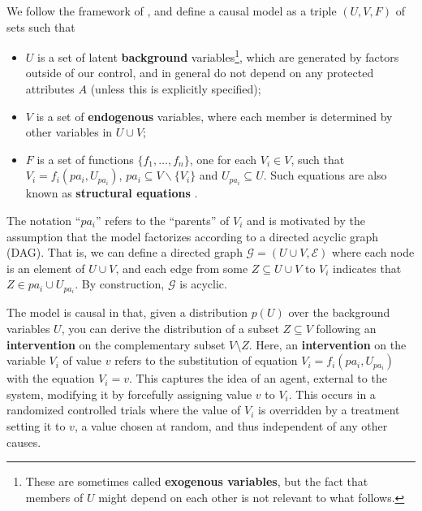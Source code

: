 


\label{subsec:cmc}
We follow the framework of \citet{pearl:00}, and define a causal
model as a triple $(U, V, F)$ of sets such that
%
\begin{itemize}
\item $U$ is a set of latent {\bf background} variables\footnote{These are
  sometimes called {\bf exogenous variables}, but the fact that members of $U$
  might depend on each other is not relevant to what follows.}, which are generated by factors
outside of our control, and in general do not depend on any protected attributes $A$ (unless this is explicitly specified);
\item $V$ is a set of {\bf endogenous} variables, where each member is determined by
  other variables in $U \cup V$;
\item $F$ is a set of functions $\{f_1, \dots, f_n\}$, one for each $V_i \in V$, such
that $V_i = f_i(pa_i, U_{pa_i})$, $pa_i \subseteq V \backslash
\{V_i\}$ and $U_{pa_i} \subseteq U$. Such equations are also known as
{\bf structural equations} \citep{bol:89}.
\end{itemize}
%
The notation ``$pa_i$'' refers to the ``parents'' of $V_i$ and is motivated by the assumption that the
model factorizes according to a directed acyclic graph (DAG). That is, we can
define a directed graph ${\mathcal G}=(U \cup V, \mathcal E )$ where each node is an
element of $U \cup V$, and each edge from some $Z \subseteq U \cup V$ to $V_i$ indicates that $Z \in pa_i \cup U_{pa_i}$. By construction, $\mathcal G$ is
acyclic.

The model is causal in that, given a distribution $p(U)$
over the background variables $U$, you can derive the distribution of
a subset $Z \subseteq V$ following an {\bf intervention} on the
complementary subset $V\setminus Z$.  Here,
an {\bf intervention} on the variable $V_i$ of value $v$ refers to the substitution of
equation $V_i = f_i(pa_i, U_{pa_i})$ with the equation $V_i =
v$. This captures the idea of an agent, external to the
system, modifying it by forcefully assigning value $v$ to $V_i$. This occurs in a randomized controlled trials where the value
of $V_i$ is overridden by a treatment setting it to $v$, a value
chosen at random, and thus independent of any other causes.%

